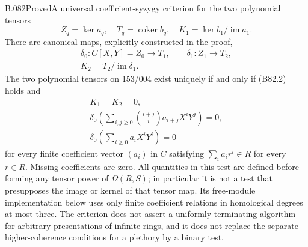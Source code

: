 \begin{saresult}{B.082}{Proved}{A universal coefficient-syzygy criterion for the two polynomial tensors}
\[
 Z_q=\ker a_q,\quad T_q=\operatorname{coker}b_q,\quad
 K_1=\ker b_1/\operatorname{im}a_1.                       \tag{B82.5}
\]
There are canonical maps, explicitly constructed in the proof,
\[
\begin{gathered}
 \delta_0:C[X,Y]=Z_0\longrightarrow T_1,
 \qquad \delta_1:Z_1\longrightarrow T_2,\\
 K_2=T_2/\operatorname{im}\delta_1.
\end{gathered}                                           \tag{B82.6}
\]
The two polynomial tensors on 153/004 exist uniquely if and only if
(B82.2) holds and
\[
\begin{gathered}
                         K_1=K_2=0,\\
 \delta_0\left(\sum_{i,j\ge0}\binom{i+j}{i}
                        a_{i+j}X^iY^j\right)=0,\\
 \delta_0\left(\sum_{i\ge0}a_iX^iY^i\right)=0            \tag{B82.7}
\end{gathered}
\]
for every finite coefficient vector $(a_i)$ in $C$ satisfying
$\sum_i a_ir^i\in R$ for every $r\in R$. Missing coefficients are zero.
All quantities in this test are defined before forming any tensor
power of $\Omega(R,S)$; in particular it is not a test that presupposes
the image or kernel of that tensor map. Its free-module implementation
below uses only finite coefficient relations in homological degrees
at most three. The criterion does not assert a uniformly terminating
algorithm for arbitrary presentations of infinite rings, and it
does not replace the separate higher-coherence conditions for a
plethory by a binary test.
\end{saresult}
